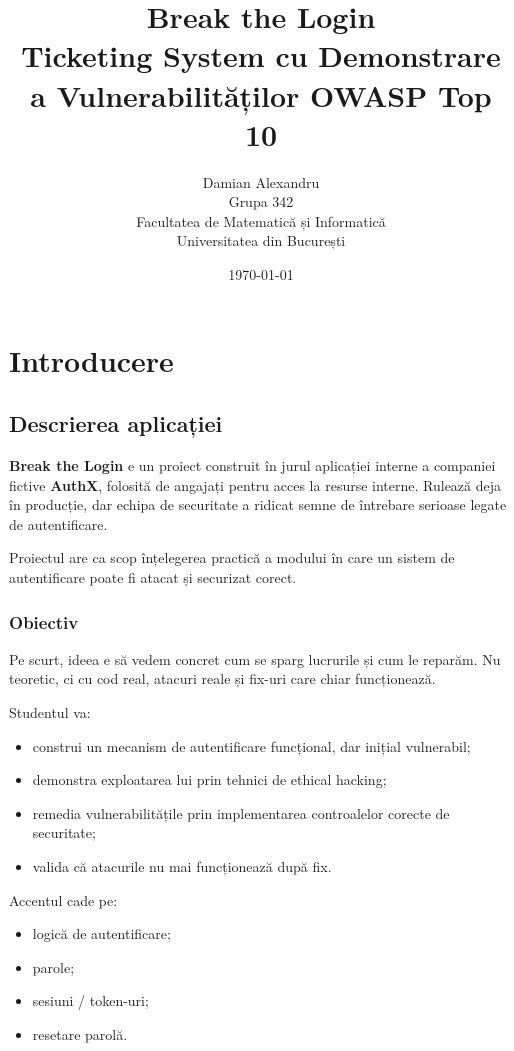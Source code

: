 \documentclass[12pt]{article}
\title{\textbf{Break the Login} \\ Ticketing System cu Demonstrare a Vulnerabilităților OWASP Top 10}
\author{Damian Alexandru \\ Grupa 342 \\ Facultatea de Matematică și Informatică \\ Universitatea din București}
\date{\today}
\begin{document}
\maketitle

\tableofcontents
\newpage

\section{Introducere}

\subsection{Descrierea aplicației}

\textbf{Break the Login} e un proiect construit în jurul aplicației interne a companiei fictive \textbf{AuthX}, folosită
de angajați pentru acces la resurse interne. Rulează deja în producție, dar
echipa de securitate a ridicat semne de întrebare serioase legate de autentificare.

Proiectul are ca scop înțelegerea practică a modului în care un sistem de
autentificare poate fi atacat și securizat corect.

\subsubsection*{Obiectiv}

Pe scurt, ideea e să vedem concret cum se sparg lucrurile și cum le reparăm.
Nu teoretic, ci cu cod real, atacuri reale și fix-uri care chiar funcționează.

Studentul va:
\begin{itemize}
    \item construi un mecanism de autentificare funcțional, dar inițial vulnerabil;
    \item demonstra exploatarea lui prin tehnici de ethical hacking;
    \item remedia vulnerabilitățile prin implementarea controalelor corecte de securitate;
    \item valida că atacurile nu mai funcționează după fix.
\end{itemize}

Accentul cade pe:
\begin{itemize}
    \item logică de autentificare;
    \item parole;
    \item sesiuni / token-uri;
    \item resetare parolă.
\end{itemize}
\end{document}
